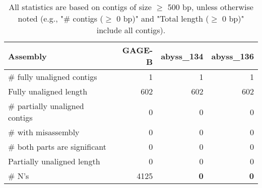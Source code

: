 \documentclass[12pt,a4paper]{article}
\begin{document}
\begin{table}[ht]
\begin{center}
\caption{All statistics are based on contigs of size $\geq$ 500 bp, unless otherwise noted (e.g., "\# contigs ($\geq$ 0 bp)" and "Total length ($\geq$ 0 bp)" include all contigs).}
\begin{tabular}{|l*{3}{|r}|}
\hline
Assembly & GAGE-B & abyss\_134 & abyss\_136 \\ \hline
\# fully unaligned contigs & 1 & 1 & 1 \\ \hline
Fully unaligned length & 602 & 602 & 602 \\ \hline
\# partially unaligned contigs & 0 & 0 & 0 \\ \hline
\hspace{5mm}\# with misassembly & 0 & 0 & 0 \\ \hline
\hspace{5mm}\# both parts are significant & 0 & 0 & 0 \\ \hline
Partially unaligned length & 0 & 0 & 0 \\ \hline
\# N's & 4125 & {\bf 0} & {\bf 0} \\ \hline
\end{tabular}
\end{center}
\end{table}
\end{document}
